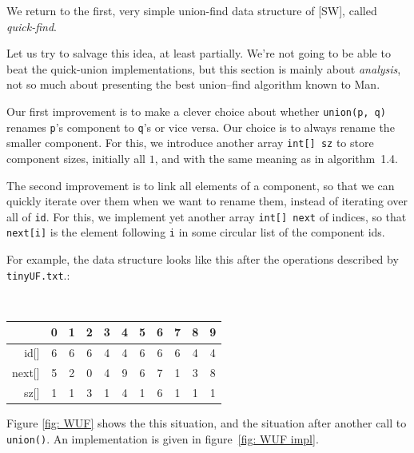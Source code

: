 \documentclass{tufte-handout}
\begin{document}
\bigskip
We return to the first, very simple union-find data structure of [SW],
called \emph{quick-find}. 

Let us try to salvage this idea, at least partially. We're not going
to be able to beat the quick-union implementations, but this section
is mainly about \emph{analysis}, not so much about presenting the best
union--find algorithm known to Man.

Our first improvement is to make a clever choice about whether
\texttt{union(p, q)} renames {\tt p}'s component to {\tt q}'s or vice
versa. 
Our choice is to always rename the smaller component.
For this, we introduce another array {\tt int[] sz} to store component sizes, initially all $1$, and with the same meaning as in algorithm~1.4.

The second improvement is to link all elements of a component, so that we can quickly iterate over them when we want to rename them, instead of iterating over all of {\tt id}.
For this, we implement yet another array {\tt int[] next} of indices,
so that {\tt next[i]} is the element following {\tt i} in some
circular list of the component ids.

For example, the data structure looks like this after the operations
described by {\tt tinyUF.txt}.:

\medskip
{\tt \small
  \begin{tabular}{rcccccccccc}
      & 0 & 1 & 2 & 3 & 4 & 5 & 6 & 7 & 8 & 9 \\\midrule
id[] & 6 &6 &6 &4 &4 &6 &6 &6 &4 &4 \\
next[] & 5 &2 &0 &4 &9 &6 &7 &1 &3 &8 \\
sz[] &1 &1 &3 &1 &4 &1 &6 &1 &1 &1 
  \end{tabular}}
\medskip

Figure \ref{fig: WUF} shows the this situation, and the situation
after another call to {\tt union()}. 
An implementation is given in figure~\ref{fig: WUF impl}.
\end{document}
